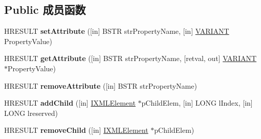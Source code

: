 \subsection*{Public 成员函数}
\begin{DoxyCompactItemize}
\item 
\mbox{\label{interface_m_s_x_m_l_1_1_i_x_m_l_element_a4b374579c63e03ecff4a564796c95fbb}} 
H\+R\+E\+S\+U\+LT {\bfseries set\+Attribute} (\mbox{[}in\mbox{]} B\+S\+TR str\+Property\+Name, \mbox{[}in\mbox{]} \hyperlink{structtag_v_a_r_i_a_n_t}{V\+A\+R\+I\+A\+NT} Property\+Value)
\item 
\mbox{\label{interface_m_s_x_m_l_1_1_i_x_m_l_element_afaea1c13e070409cedad129324c201a1}} 
H\+R\+E\+S\+U\+LT {\bfseries get\+Attribute} (\mbox{[}in\mbox{]} B\+S\+TR str\+Property\+Name, \mbox{[}retval, out\mbox{]} \hyperlink{structtag_v_a_r_i_a_n_t}{V\+A\+R\+I\+A\+NT} $\ast$Property\+Value)
\item 
\mbox{\label{interface_m_s_x_m_l_1_1_i_x_m_l_element_a8c888318219e5292160df9ec2b8eca72}} 
H\+R\+E\+S\+U\+LT {\bfseries remove\+Attribute} (\mbox{[}in\mbox{]} B\+S\+TR str\+Property\+Name)
\item 
\mbox{\label{interface_m_s_x_m_l_1_1_i_x_m_l_element_a4976e44625190715b2ca8e9ec1ed8974}} 
H\+R\+E\+S\+U\+LT {\bfseries add\+Child} (\mbox{[}in\mbox{]} \hyperlink{interface_m_s_x_m_l_1_1_i_x_m_l_element}{I\+X\+M\+L\+Element} $\ast$p\+Child\+Elem, \mbox{[}in\mbox{]} L\+O\+NG l\+Index, \mbox{[}in\mbox{]} L\+O\+NG lreserved)
\item 
\mbox{\label{interface_m_s_x_m_l_1_1_i_x_m_l_element_a1a0e87e01c33414b44ed01ea73093ca9}} 
H\+R\+E\+S\+U\+LT {\bfseries remove\+Child} (\mbox{[}in\mbox{]} \hyperlink{interface_m_s_x_m_l_1_1_i_x_m_l_element}{I\+X\+M\+L\+Element} $\ast$p\+Child\+Elem)
\end{DoxyCompactItemize}
